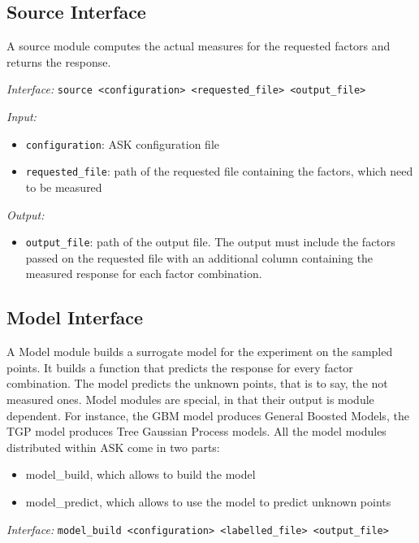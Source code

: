 \subsection{Source Interface}

A source module computes the actual measures for the requested factors and returns the response.

\emph{Interface:} \texttt{source \textless{}configuration\textgreater{} \textless{}requested\_file\textgreater{} \textless{}output\_file\textgreater{}} 

\emph{Input:}
\begin{itemize}
	\item \texttt{configuration}: ASK configuration file
	\item \texttt{requested\_file}: path of the requested file containing the factors, which need to be measured
\end{itemize}

\emph{Output:}
\begin{itemize}
	\item \texttt{output\_file}: path of the output file. The output must include the factors passed on the requested file with an additional column containing the measured response for each factor combination.
\end{itemize}

\subsection{Model Interface}

A Model module builds a surrogate model for the experiment on the sampled points. It builds a function that predicts the response for every factor combination. The model predicts the unknown points, that is to say, the not measured ones.
Model modules are special, in that their output is module dependent. For instance, the GBM model produces General Boosted Models, the TGP model produces Tree Gaussian Process models. All the model modules distributed within ASK come in two parts:

\begin{itemize}
	\item model\_build, which allows to build the model
	\item model\_predict, which allows to use the model to predict unknown points
\end{itemize}

\emph{Interface:} \texttt{model\_build \textless{}configuration\textgreater{} \textless{}labelled\_file\textgreater{} \textless{}output\_file\textgreater{}} 

